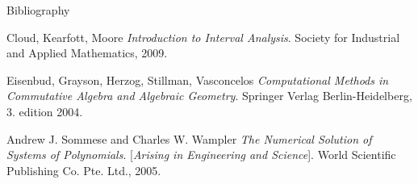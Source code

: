 \documentclass[german,10pt,xcolor=colortbl,compress, handout]{beamer}
\begin{document}

\begin{frame}{Bibliography}
    
    \begin{thebibliography}{9}
         Cloud, Kearfott, Moore
            \textit{Introduction to Interval Analysis}.
            Society for Industrial and Applied Mathematics, 2009.


         Eisenbud, Grayson, Herzog, Stillman, Vasconcelos
            \textit{Computational Methods in Commutative Algebra and Algebraic Geometry}.
            Springer Verlag Berlin-Heidelberg, 3. edition 2004.

         Andrew J. Sommese and Charles W. Wampler
            \textit{The Numerical Solution of Systems of Polynomials}. [\textit{Arising in
            Engineering and Science}].
            World Scientific Publishing Co. Pte. Ltd., 2005.

    \end{thebibliography}
\end{frame}
\end{document}
